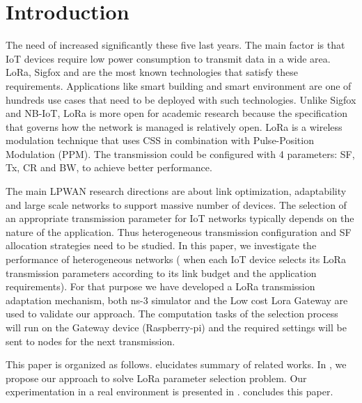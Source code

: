 \section{Introduction} \label{sec:Introduction}

The need of  increased significantly these five last years.
The main factor is that IoT devices require low power consumption to transmit data in a wide area.
LoRa,
	Sigfox and  are the most known technologies that satisfy these requirements.
Applications like smart building and smart environment are one of hundreds use cases that need to be deployed with such technologies.
Unlike Sigfox and NB-IoT,
	LoRa is more open for academic research because the specification that governs how the network is managed is relatively open.
LoRa is a wireless modulation technique that uses \ac{CSS} in combination with Pulse-Position Modulation (PPM).
The transmission could be configured with 4 parameters:
	\ac{SF},
	\ac{Tx},
	\ac{CR} and \ac{BW},
	to achieve better performance.

The main LPWAN research directions are about link optimization, adaptability and large scale networks to support massive number of devices.
The selection of an appropriate transmission parameter for IoT networks typically depends on the nature of the application.
Thus heterogeneous transmission configuration and \ac{SF} allocation strategies need to be studied.
In this paper,
	we investigate the performance of heterogeneous networks (\ie\red{,}
	when each IoT device selects its LoRa transmission parameters according to its link budget and the application requirements).
For that purpose\red{,} we have developed a LoRa transmission adaptation mechanism,
	both ns-3 simulator and the Low cost Lora Gateway \cite{lowcostloragateway} are used to validate our approach.
The computation tasks of the selection process will run on the Gateway device (Raspberry-pi) and the required settings will be sent to nodes for the next transmission.

This paper is organized as follows.
 elucidates summary of related works.
In , we propose our approach to solve LoRa parameter selection problem.
Our experimentation in a real environment is presented in .
 concludes this paper.


